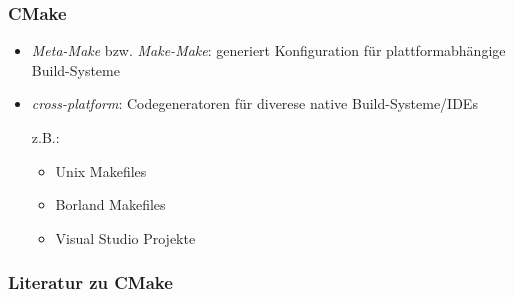 \begin{frame}
	\frametitle{CMake}
	\begin{itemize}
		\pause
		\item \emph{Meta-Make} bzw. \emph{Make-Make}: generiert Konfiguration für plattformabhängige Build-Systeme
		\pause
		\item \emph{cross-platform}: Codegeneratoren für diverese native Build-Systeme/IDEs

			z.B.:
			\begin{itemize}
				\item Unix Makefiles
				\item Borland Makefiles
				\item Visual Studio Projekte
			\end{itemize}
	\end{itemize}
\end{frame}

\begin{frame}
	\frametitle{Literatur zu CMake}
\end{frame}
